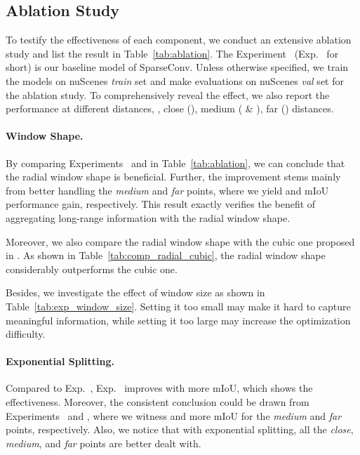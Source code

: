 \documentclass[10pt,twocolumn,letterpaper]{article}
\begin{document}
\subsection{Ablation Study}
\label{sec:ablation}
To testify the effectiveness of each component, we conduct an extensive ablation study and list the result in Table~\ref{tab:ablation}. The Experiment~\uppercase\expandafter{} (Exp.~\uppercase\expandafter{} for short) is our baseline model of SparseConv. Unless otherwise specified, we train the models on nuScenes \textit{train} set and make evaluations on nuScenes \textit{val} set for the ablation study. To comprehensively 
reveal the effect, we also report the performance at different distances, \ie, close (), medium ( \& ), far () distances.

\paragraph{Window Shape.}
By comparing Experiments~\uppercase\expandafter{} and \uppercase\expandafter{} in Table~\ref{tab:ablation}, we can conclude that the radial window shape is beneficial. Further, the improvement stems mainly from better handling the \textit{medium} and \textit{far} points, where we yield  and  mIoU performance gain, respectively. This result exactly verifies the benefit of aggregating long-range information with the radial window shape.

Moreover, we also compare the radial window shape with the cubic one proposed in \cite{fan2022embracing,mao2021voxel,lai2022stratified}. As shown in Table~\ref{tab:comp_radial_cubic}, the radial window shape considerably outperforms the cubic one.

Besides, we investigate the effect of window size as shown in Table~\ref{tab:exp_window_size}. Setting it too small may make it hard to capture meaningful information, while setting it too large may increase the optimization difficulty.

\vspace{-0.1cm}
\paragraph{Exponential Splitting.}
Compared to Exp.~\uppercase\expandafter{}, Exp.~\uppercase\expandafter{} improves with  more mIoU, which shows the effectiveness. Moreover, the consistent conclusion could be drawn from Experiments~\uppercase\expandafter{} and \uppercase\expandafter{}, where we witness  and  more mIoU for the \textit{medium} and \textit{far} points, respectively. Also, we notice that with exponential splitting, all the \textit{close}, \textit{medium}, and \textit{far} points are better dealt with.
\end{document}
